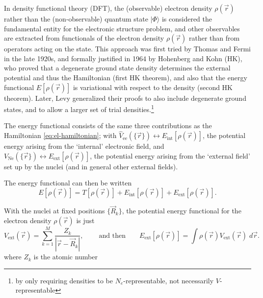 \documentclass[11pt,bibliography=totoc,index=totoc]{scrbook}   %
\begin{document}
In density functional theory (DFT), the (observable) electron density $\rho(\vec{r})$ rather than the (non-observable) quantum state $|\Phi\rangle$ is considered the fundamental entity for the electronic structure problem, and other observables are extracted from functionals of the electron density $\rho(\vec{r})$ rather than from operators acting on the state.
This approach was first tried by Thomas\cite{Thomas:1927} and Fermi\cite{Fermi:1928} in the late 1920s, 
and formally justified in 1964 by Hohenberg and Kohn (HK), who proved that a degenerate ground state density determines the external potential and thus the Hamiltonian (first HK theorem),
and also that the energy functional $E[\rho(\vec{r})]$ is variational with respect to the density (second HK theorem).\cite{HohenbergKohn:1964}
Later, Levy generalized their proofs to also include degenerate ground states, and to allow a larger set of trial densities.\footnote{by only requiring densities to be $N_e$-representable, not necessarily $V$-representable}\cite{Levy:1979,Levy:1982}

The energy functional consists of the same three contributions as the Hamiltonian \eqref{eq:el-hamiltonian}; with $\hat{V}_{\text{ee}}(\{\vec{r}\}) \leftrightarrow E_{\text{int}}[\rho(\vec{r})]$, the potential energy arising from the `internal' electronic field, and $V_{\text{Ne}}(\{\vec{r}\}) \leftrightarrow E_{\text{ext}}[\rho(\vec{r})]$, the potential energy arising from the `external field' set up by the nuclei (and in general other external fields).

The energy functional can then be written
\begin{equation}
    E[\rho(\vec{r})] = T[\rho(\vec{r})] + E_{\text{int}}[\rho(\vec{r})] + E_{\text{ext}}[\rho(\vec{r})].
    \label{eq:energy_functional}
\end{equation}

With the nuclei at fixed positions $\{\vec{R}_k\}$, the potential energy functional for the electron density $\rho(\vec{r})$ is just
\begin{equation}
  V_{\text{ext}}(\vec{r}) = \sum_{k=1}^M \frac{Z_k}{|\vec{r}-\vec{R}_k|},\
    \qquad\text{and then}\qquad
    E_{\text{ext}}[\rho(\vec{r})] = \int\rho(\vec{r})V_{\text{ext}}(\vec{r})\;d\vec{r}.
  \label{eq:nuclei-pot}
\end{equation}
where $Z_k$ is the atomic number
\end{document}
